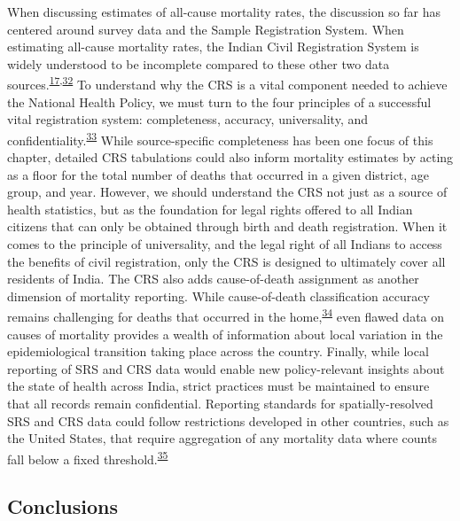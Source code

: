 \documentclass[
]{article}
\begin{document}
When discussing estimates of all-cause mortality rates, the discussion so far has centered around survey data and the Sample Registration System. When estimating all-cause mortality rates, the Indian Civil Registration System is widely understood to be incomplete compared to these other two data sources.\textsuperscript{\protect\hyperlink{ref-Kumar2019}{17},\protect\hyperlink{ref-Gupta2016}{32}} To understand why the CRS is a vital component needed to achieve the National Health Policy, we must turn to the four principles of a successful vital registration system: completeness, accuracy, universality, and confidentiality.\textsuperscript{\protect\hyperlink{ref-UnitedNationsStatisticsDivision2014}{33}} While source-specific completeness has been one focus of this chapter, detailed CRS tabulations could also inform mortality estimates by acting as a floor for the total number of deaths that occurred in a given district, age group, and year. However, we should understand the CRS not just as a source of health statistics, but as the foundation for legal rights offered to all Indian citizens that can only be obtained through birth and death registration. When it comes to the principle of universality, and the legal right of all Indians to access the benefits of civil registration, only the CRS is designed to ultimately cover all residents of India. The CRS also adds cause-of-death assignment as another dimension of mortality reporting. While cause-of-death classification accuracy remains challenging for deaths that occurred in the home,\textsuperscript{\protect\hyperlink{ref-Kotabagi2004}{34}} even flawed data on causes of mortality provides a wealth of information about local variation in the epidemiological transition taking place across the country. Finally, while local reporting of SRS and CRS data would enable new policy-relevant insights about the state of health across India, strict practices must be maintained to ensure that all records remain confidential. Reporting standards for spatially-resolved SRS and CRS data could follow restrictions developed in other countries, such as the United States, that require aggregation of any mortality data where counts fall below a fixed threshold.\textsuperscript{\protect\hyperlink{ref-Thacker1988}{35}}

\hypertarget{conclusions}{%
\subsection{Conclusions}\label{conclusions}}
\end{document}
